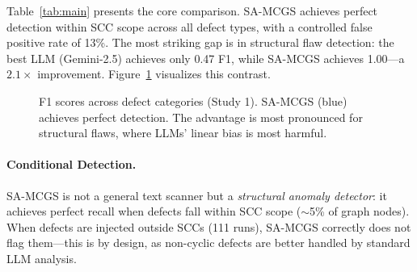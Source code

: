 \documentclass{article}
\begin{document}
Table~\ref{tab:main} presents the core comparison. SA-MCGS achieves perfect detection within SCC scope across all defect types, with a controlled false positive rate of 13\%. The most striking gap is in structural flaw detection: the best LLM (Gemini-2.5) achieves only 0.47 F1, while SA-MCGS achieves 1.00---a $2.1\times$ improvement. Figure~\ref{fig:f1_comparison} visualizes this contrast.

\begin{figure}[t]
    \centering
    \caption{F1 scores across defect categories (Study 1). SA-MCGS (blue) achieves perfect detection. The advantage is most pronounced for structural flaws, where LLMs' linear bias is most harmful.}
    \label{fig:f1_comparison}
\end{figure}

\paragraph{Conditional Detection.} SA-MCGS is not a general text scanner but a \emph{structural anomaly detector}: it achieves perfect recall when defects fall within SCC scope ($\sim$5\% of graph nodes). When defects are injected outside SCCs (111 runs), SA-MCGS correctly does not flag them---this is by design, as non-cyclic defects are better handled by standard LLM analysis.
\end{document}
